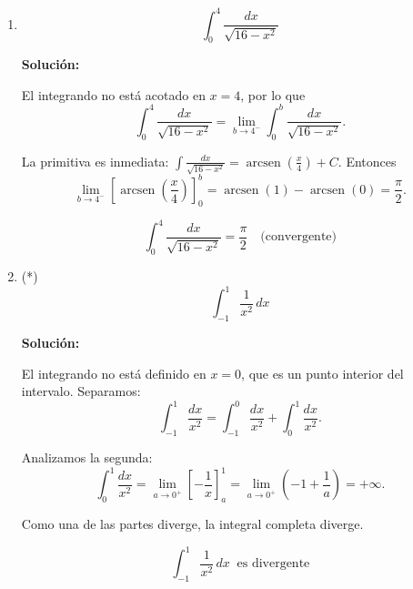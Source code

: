 \documentclass[12pt]{article}
\newcommand{\solucion}{%
    \vspace{0.8em}%
    \textbf{Solución:}%
}
\begin{document}
\begin{enumerate}[label=\alph*.-]
    \solucion

    Es una integral impropia de segunda especie: en $x=0$ el denominador
    se anula ($\sqrt{0^2+2\cdot0}=0$) y el integrando no está acotado.
    \[
    \int_{0}^{1}\frac{x+1}{\sqrt{x^2+2x}}\,dx
    =\lim_{a\to0^+}\int_{a}^{1}\frac{x+1}{\sqrt{x^2+2x}}\,dx.
    \]

    Con $u=x^2+2x$, $du=2(x+1)\,dx$:
    \[
    \int\frac{x+1}{\sqrt{x^2+2x}}\,dx=\frac12\int u^{-1/2}\,du=\sqrt u+C
    =\sqrt{x^2+2x}+C.
    \]

    Entonces
    \[
    \lim_{a\to0^+}\left[\sqrt{x^2+2x}\right]_{a}^{1}
    =\lim_{a\to0^+}\left(\sqrt3-\sqrt{a^2+2a}\right)=\sqrt3.
    \]

    \[
    \boxed{
    \int_{0}^{1}\frac{x+1}{\sqrt{x^2+2x}}\,dx=\sqrt3
    \quad\text{(convergente)}
    }
    \]


    \item
    \[
    \int_{0}^{4}\frac{dx}{\sqrt{16-x^2}}
    \]

    \solucion

    El integrando no está acotado en $x=4$, por lo que
    \[
    \int_{0}^{4}\frac{dx}{\sqrt{16-x^2}}
    =\lim_{b\to4^-}\int_{0}^{b}\frac{dx}{\sqrt{16-x^2}}.
    \]

    La primitiva es inmediata:
    $\displaystyle\int\frac{dx}{\sqrt{16-x^2}}=\operatorname{arcsen}\left(\frac x4\right)+C$.
    Entonces
    \[
    \lim_{b\to4^-}\left[\operatorname{arcsen}\left(\frac x4\right)\right]_{0}^{b}
    =\operatorname{arcsen}(1)-\operatorname{arcsen}(0)=\frac\pi2.
    \]

    \[
    \boxed{
    \int_{0}^{4}\frac{dx}{\sqrt{16-x^2}}=\frac\pi2
    \quad\text{(convergente)}
    }
    \]


    \item (*)
    \[
    \int_{-1}^{1}\frac{1}{x^2}\,dx
    \]

    \solucion

    El integrando no está definido en $x=0$, que es un punto interior del
    intervalo. Separamos:
    \[
    \int_{-1}^{1}\frac{dx}{x^2}=\int_{-1}^{0}\frac{dx}{x^2}+\int_{0}^{1}\frac{dx}{x^2}.
    \]

    Analizamos la segunda:
    \[
    \int_{0}^{1}\frac{dx}{x^2}
    =\lim_{a\to0^+}\left[-\frac1x\right]_{a}^{1}
    =\lim_{a\to0^+}\left(-1+\frac1a\right)=+\infty.
    \]

    Como una de las partes diverge, la integral completa diverge.

    \[
    \boxed{
    \int_{-1}^{1}\frac{1}{x^2}\,dx\ \text{ es divergente}
    }
    \]


\end{enumerate}
\end{document}

